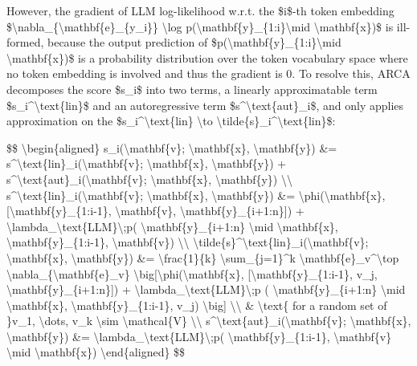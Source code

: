 However, the gradient of LLM log-likelihood w.r.t. the \$i\$-th token embedding \$\textbackslash nabla\_\{\textbackslash mathbf\{e\}\_\{y\_i\}\} \textbackslash log p(\textbackslash mathbf\{y\}\_\{1:i\}\textbackslash mid \textbackslash mathbf\{x\})\$ is ill-formed, because the output prediction of \$p(\textbackslash mathbf\{y\}\_\{1:i\}\textbackslash mid \textbackslash mathbf\{x\})\$ is a probability distribution over the token vocabulary space where no token embedding is involved and thus the gradient is 0. To resolve this, ARCA decomposes the score \$s\_i\$ into two terms, a linearly approximatable term \$s\_i\^{}\textbackslash text\{lin\}\$ and an autoregressive term \$s\^{}\textbackslash text\{aut\}\_i\$, and only applies approximation on the \$s\_i\^{}\textbackslash text\{lin\} \textbackslash to \textbackslash tilde\{s\}\_i\^{}\textbackslash text\{lin\}\$:

\$\$ \textbackslash begin\{aligned\} s\_i(\textbackslash mathbf\{v\}; \textbackslash mathbf\{x\}, \textbackslash mathbf\{y\}) \&= s\^{}\textbackslash text\{lin\}\_i(\textbackslash mathbf\{v\}; \textbackslash mathbf\{x\}, \textbackslash mathbf\{y\}) + s\^{}\textbackslash text\{aut\}\_i(\textbackslash mathbf\{v\}; \textbackslash mathbf\{x\}, \textbackslash mathbf\{y\}) \textbackslash\textbackslash{} s\^{}\textbackslash text\{lin\}\_i(\textbackslash mathbf\{v\}; \textbackslash mathbf\{x\}, \textbackslash mathbf\{y\}) \&= \textbackslash phi(\textbackslash mathbf\{x\}, {[}\textbackslash mathbf\{y\}\_\{1:i-1\}, \textbackslash mathbf\{v\}, \textbackslash mathbf\{y\}\_\{i+1:n\}{]}) + \textbackslash lambda\_\textbackslash text\{LLM\}\textbackslash;p( \textbackslash mathbf\{y\}\_\{i+1:n\} \textbackslash mid \textbackslash mathbf\{x\}, \textbackslash mathbf\{y\}\_\{1:i-1\}, \textbackslash mathbf\{v\}) \textbackslash\textbackslash{} \textbackslash tilde\{s\}\^{}\textbackslash text\{lin\}\_i(\textbackslash mathbf\{v\}; \textbackslash mathbf\{x\}, \textbackslash mathbf\{y\}) \&= \textbackslash frac\{1\}\{k\} \textbackslash sum\_\{j=1\}\^{}k \textbackslash mathbf\{e\}\_v\^{}\textbackslash top \textbackslash nabla\_\{\textbackslash mathbf\{e\}\_v\} \textbackslash big{[}\textbackslash phi(\textbackslash mathbf\{x\}, {[}\textbackslash mathbf\{y\}\_\{1:i-1\}, v\_j, \textbackslash mathbf\{y\}\_\{i+1:n\}{]}) + \textbackslash lambda\_\textbackslash text\{LLM\}\textbackslash;p ( \textbackslash mathbf\{y\}\_\{i+1:n\} \textbackslash mid \textbackslash mathbf\{x\}, \textbackslash mathbf\{y\}\_\{1:i-1\}, v\_j) \textbackslash big{]} \textbackslash\textbackslash{} \& \textbackslash text\{ for a random set of \}v\_1, \textbackslash dots, v\_k \textbackslash sim \textbackslash mathcal\{V\} \textbackslash\textbackslash{} s\^{}\textbackslash text\{aut\}\_i(\textbackslash mathbf\{v\}; \textbackslash mathbf\{x\}, \textbackslash mathbf\{y\}) \&= \textbackslash lambda\_\textbackslash text\{LLM\}\textbackslash;p( \textbackslash mathbf\{y\}\_\{1:i-1\}, \textbackslash mathbf\{v\} \textbackslash mid \textbackslash mathbf\{x\}) \textbackslash end\{aligned\} \$\$

